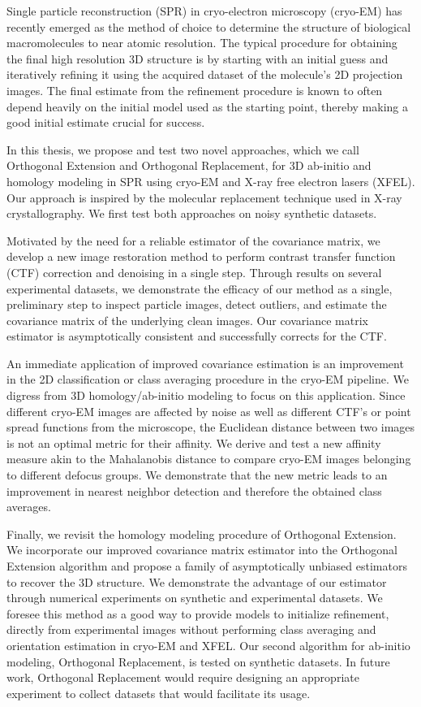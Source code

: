 
Single particle reconstruction (SPR) in cryo-electron microscopy (cryo-EM) has recently emerged as the method of choice to determine the structure of biological macromolecules to near atomic resolution. The typical procedure for obtaining the final high resolution 3D structure is by starting with an initial guess and iteratively refining it using the acquired dataset of the molecule's 2D projection images. The final estimate from the refinement procedure is known to often depend heavily on the initial model used as the starting point, thereby making a good initial estimate crucial for success.

In this thesis, we propose and test two novel approaches, which we call Orthogonal Extension and Orthogonal Replacement, for 3D ab-initio and homology modeling in SPR using cryo-EM and X-ray free electron lasers (XFEL). Our approach is inspired by the molecular replacement technique used in X-ray crystallography. We first test both approaches on noisy synthetic datasets.

Motivated by the need for a reliable estimator of the covariance matrix, we develop a new image restoration method to perform contrast transfer function (CTF) correction and denoising in a single step. Through results on several experimental datasets, we demonstrate the efficacy of our method as a single, preliminary step to inspect particle images, detect outliers, and estimate the covariance matrix of the underlying clean images. Our covariance matrix estimator is asymptotically consistent and successfully corrects for the CTF.

An immediate application of improved covariance estimation is an improvement in the 2D classification or class averaging procedure in the cryo-EM pipeline. We digress from 3D homology/ab-initio modeling to focus on this application. Since different cryo-EM images are affected by noise as well as different CTF's or point spread functions from the microscope, the Euclidean distance between two images is not an optimal metric for their affinity. We derive and test a new affinity measure akin to the Mahalanobis distance to compare cryo-EM images belonging to different defocus groups. We demonstrate that the new metric leads to an improvement in nearest neighbor detection and therefore the obtained class averages.

Finally, we revisit the homology modeling procedure of Orthogonal Extension. We incorporate our improved covariance matrix estimator into the Orthogonal Extension algorithm and propose a family of asymptotically unbiased estimators to recover the 3D structure. We demonstrate the advantage of our estimator through numerical experiments on synthetic and experimental datasets. We foresee this method as a good way to provide models to initialize refinement, directly from experimental images without performing class averaging and orientation estimation in cryo-EM and XFEL. Our second algorithm for ab-initio modeling, Orthogonal Replacement, is tested on synthetic datasets. In future work, Orthogonal Replacement would require designing an appropriate experiment to collect datasets that would facilitate its usage.  